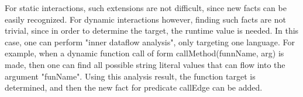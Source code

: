 For static interactions, such extensions are not difficult, since new facts can be easily recognized.
For dynamic interactions however, finding such facts are not trivial, since in order to determine the
target, the runtime value is needed. In this case, one can perform "inner dataflow analysis", only targeting
one language. For example, when a dynamic function call of form callMethod(funnName, arg) is made,
then one can find all possible string literal values that can flow into the argument "funName". Using this
analysis result, the function target is determined, and then the new fact for predicate callEdge can be added.
